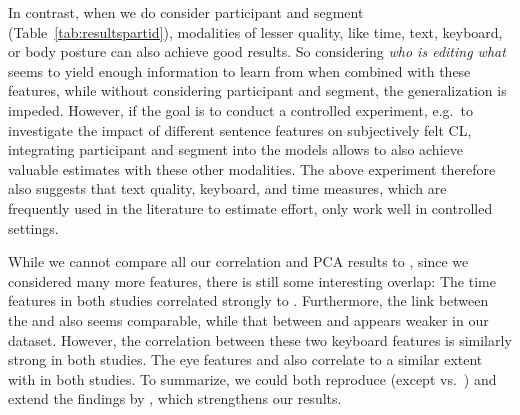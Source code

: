 \documentclass[output=paper]{langsci/langscibook}
\begin{document}
In contrast, when we do consider participant and segment (Table~\ref{tab:resultspartid}), modalities of lesser quality, like time, text, keyboard, or body posture can also achieve good results. So considering \textit{who is editing what} seems to yield enough information to learn from when combined with these features, while without considering participant and segment, the generalization is impeded. %
However, if the goal is to conduct a controlled experiment, e.g.\ to investigate the impact of different sentence features on subjectively felt CL, integrating participant and segment into the models allows to also achieve valuable estimates with these other modalities. The above experiment therefore also suggests that text quality, keyboard, and time measures, which are frequently used in the literature to estimate effort, only work well in controlled settings.

While we cannot compare all our correlation and PCA results to \citet{vieira2016measures}, since we considered many more features, there is still some interesting overlap:
The time features in both studies correlated strongly to \subjCL{}.
Furthermore, the link between the \pwr{} and \subjCL{} also seems comparable, while that between \apr{} and \subjCL{} appears weaker in our dataset. However, the correlation between these two keyboard features is similarly strong in both studies.
The eye features \fixamount{} and \fixdur{} also correlate to a similar extent with \subjCL{} in both studies.
To summarize, we could both reproduce (except \apr{} vs.\ \subjCL{}) and extend the findings by \citet{vieira2016measures}, which strengthens our results.
\end{document}

